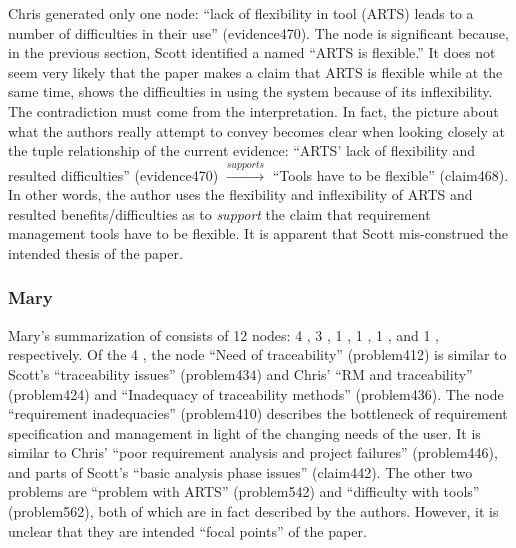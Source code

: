 Chris generated only one  node: ``lack of flexibility
in tool (ARTS) leads to a number of difficulties in their use''
(evidence470). The node is significant because, in the previous section,
Scott identified a  named ``ARTS is flexible.'' It does
not seem very likely that the paper makes a claim that ARTS is flexible
while at the same time, shows the difficulties in using the system because
of its inflexibility.  The contradiction must come from the interpretation.
In fact, the picture about what the authors really attempt to convey
becomes clear when looking closely at the tuple relationship of the current
evidence: ``ARTS' lack of flexibility and resulted difficulties''
(evidence470) \(\stackrel{supports}{\longrightarrow}\) ``Tools have to be
flexible'' (claim468). In other words, the author uses the flexibility and
inflexibility of ARTS and resulted benefits/difficulties as  to {\it support\/} the claim that requirement management tools
have to be flexible. It is apparent that Scott mis-construed the intended
thesis of the paper.


\subsubsection{Mary}

Mary's summarization of \cite{Flynn90} consists of 12 nodes: 4 , 3 , 1 , 1 , 1 , and 1 , respectively. Of
the 4 , the node ``Need of traceability'' (problem412)
is similar to Scott's ``traceability issues'' (problem434) and Chris' ``RM
and traceability'' (problem424) and ``Inadequacy of traceability methods''
(problem436). The node ``requirement inadequacies'' (problem410) describes
the bottleneck of requirement specification and management in light of the
changing needs of the user. It is similar to Chris' ``poor requirement
analysis and project failures'' (problem446), and parts of Scott's ``basic
analysis phase issues'' (claim442). The other two problems are ``problem
with ARTS'' (problem542) and ``difficulty with tools'' (problem562), both
of which are in fact described by the authors. However, it is unclear that
they are intended ``focal points'' of the paper.

